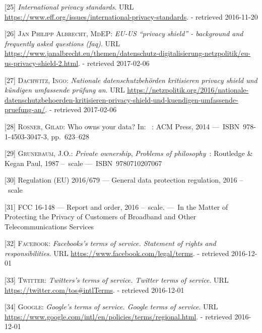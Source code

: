 \documentclass[12pt,english,a4paper,titlepage,cleardoublepage=empty,dottedtoc]{report}
\begin{document}
\hypertarget{ref-web_2016_international-privacy-standards}{}
{[}25{]} \emph{International privacy standards}. URL
\url{https://www.eff.org/issues/international-privacy-standards}. -
retrieved 2016-11-20

\hypertarget{ref-web_2017_privacy-shield_faq}{}
{[}26{]} \textsc{Jan Philipp Albrecht, MdEP}: \emph{EU-US ``privacy
shield'' - background and frequently asked questions (faq)}. URL
\url{https://www.janalbrecht.eu/themen/datenschutz-digitalisierung-netzpolitik/eu-us-privacy-shield-2.html}.
- retrieved 2017-02-06

\hypertarget{ref-web_2017_privacy-shield_kritik}{}
{[}27{]} \textsc{Dachwitz, Ingo}: \emph{Nationale datenschutzbehörden
kritisieren privacy shield und kündigen umfassende prüfung an}. URL
\url{https://netzpolitik.org/2016/nationale-datenschutzbehoerden-kritisieren-privacy-shield-und-kuendigen-umfassende-pruefung-an/}.
- retrieved 2017-02-06

\hypertarget{ref-paper_2014_who-owns-yours-data}{}
{[}28{]} \textsc{Rosner, Gilad}: Who owns your data? In: ~: ACM Press,
2014 ---~ISBN~978-1-4503-3047-3, pp.~623--628

\hypertarget{ref-book_1987_private-ownership_definition}{}
{[}29{]} \textsc{Grunebaum, J.O.}: \emph{Private ownership},
\emph{Problems of philosophy}~: Routledge \& Kegan Paul, 1987 --~scale
---~ISBN~9780710207067

\hypertarget{ref-regulation_2016_eu_general-data-protection-regulation_ownership}{}
{[}30{]} Regulation (EU) 2016/679 --- General data protection
regulation, 2016 --~scale

\hypertarget{ref-rules_2016_fcc_to-protect-broadband-consumer-privacy_ownership}{}
{[}31{]} FCC 16-148 --- Report and order, 2016 --~scale. ---~In the
Matter of Protecting the Privacy of Customers of Broadband and Other
Telecommunications Services

\hypertarget{ref-web_2016_facebook_terms-of-service}{}
{[}32{]} \textsc{Facebook}: \emph{Facebooks's terms of service.
Statement of rights and responsibilities}. URL
\url{https://www.facebook.com/legal/terms}. - retrieved 2016-12-01

\hypertarget{ref-web_2016_twitter_terms-of-service}{}
{[}33{]} \textsc{Twitter}: \emph{Twitters's terms of service. Twitter
terms of service}. URL \url{https://twitter.com/tos\#intlTerms}. -
retrieved 2016-12-01

\hypertarget{ref-web_2016_google_terms-of-service}{}
{[}34{]} \textsc{Google}: \emph{Google's terms of service. Google terms
of service}. URL
\url{https://www.google.com/intl/en/policies/terms/regional.html}. -
retrieved 2016-12-01
\end{document}
